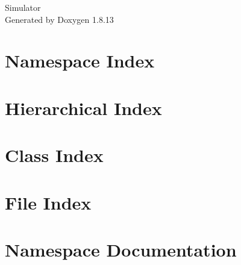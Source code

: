 \documentclass[twoside]{book}
\newcommand{\+}{\discretionary{\mbox{\scriptsize$\hookleftarrow$}}{}{}}
\newcommand{\clearemptydoublepage}{%
  \newpage{\pagestyle{empty}\cleardoublepage}%
}
\begin{document}
\begin{titlepage}
\vspace*{7cm}
\begin{center}%
{\Large Simulator }\\
\vspace*{1cm}
{\large Generated by Doxygen 1.8.13}\\
\end{center}
\end{titlepage}
\clearemptydoublepage
{}
\tableofcontents
\clearemptydoublepage
{}

\chapter{Namespace Index}

\chapter{Hierarchical Index}

\chapter{Class Index}

\chapter{File Index}

\chapter{Namespace Documentation}



\end{document}
